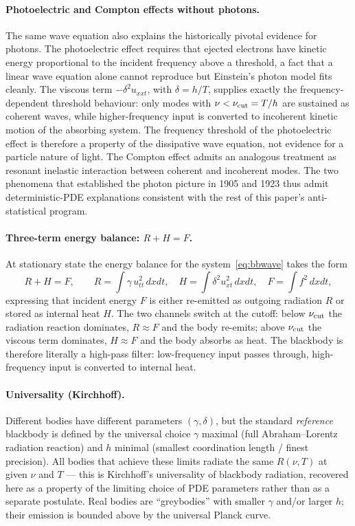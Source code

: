 \documentclass[11pt]{article}
\begin{document}
\paragraph{Photoelectric and Compton effects without photons.}
The same wave equation also explains the historically pivotal evidence for photons. The photoelectric effect requires that ejected electrons have kinetic energy proportional to the incident frequency above a threshold, a fact that a linear wave equation alone cannot reproduce but Einstein's photon model fits cleanly. The viscous term $-\delta^2 u_{xxt}$, with $\delta = h/T$, supplies exactly the frequency-dependent threshold behaviour: only modes with $\nu < \nu_{\rm cut} = T/h$ are sustained as coherent waves, while higher-frequency input is converted to incoherent kinetic motion of the absorbing system. The frequency threshold of the photoelectric effect is therefore a property of the dissipative wave equation, not evidence for a particle nature of light. The Compton effect admits an analogous treatment as resonant inelastic interaction between coherent and incoherent modes. The two phenomena that established the photon picture in 1905 and 1923 thus admit deterministic-PDE explanations consistent with the rest of this paper's anti-statistical program.

\paragraph{Three-term energy balance: $R + H = F$.}
At stationary state the energy balance for the system~\eqref{eq:bbwave} takes the form
\begin{equation}
R + H = F, \qquad R = \int \gamma\, u_{tt}^2\,dxdt,\quad H = \int \delta^2 u_{xt}^2\,dxdt,\quad F = \int f^2\,dxdt,
\label{eq:rhf}
\end{equation}
expressing that incident energy $F$ is either re-emitted as outgoing radiation $R$ or stored as internal heat $H$. The two channels switch at the cutoff: below $\nu_{\rm cut}$ the radiation reaction dominates, $R \approx F$ and the body re-emits; above $\nu_{\rm cut}$ the viscous term dominates, $H \approx F$ and the body absorbs as heat. The blackbody is therefore literally a high-pass filter: low-frequency input passes through, high-frequency input is converted to internal heat.

\paragraph{Universality (Kirchhoff).}
Different bodies have different parameters $(\gamma, \delta)$, but the standard \emph{reference} blackbody is defined by the universal choice $\gamma$ maximal (full Abraham--Lorentz radiation reaction) and $h$ minimal (smallest coordination length / finest precision). All bodies that achieve these limits radiate the same $R(\nu, T)$ at given $\nu$ and $T$ --- this is Kirchhoff's universality of blackbody radiation, recovered here as a property of the limiting choice of PDE parameters rather than as a separate postulate. Real bodies are ``greybodies'' with smaller $\gamma$ and/or larger $h$; their emission is bounded above by the universal Planck curve.
\end{document}

